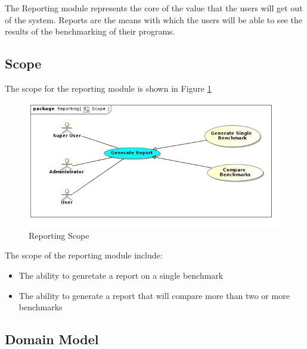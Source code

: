 The Reporting module represents the core of the value that the users will
get out of the system. Reports are the means with which the users will
be able to see the results of the benchmarking of their programs.

\subsection{Scope}
The scope for the reporting module is shown in Figure \ref{Reporting Scope}
\begin{figure}[H]
  \begin{center}
  \includegraphics[scale=0.7]{../Diagrams and Charts/Reporting/Scope.jpg}
  \caption{Reporting Scope}
  \end{center}
  \label{Reporting Scope}
\end{figure}

The scope of the reporting module include:
\begin{itemize}
	\item The ability to genretate a report on a single benchmark
	\item The ability to generate a report that will compare more than
	two or more benchmarks
\end{itemize}

\subsection{Domain Model}
